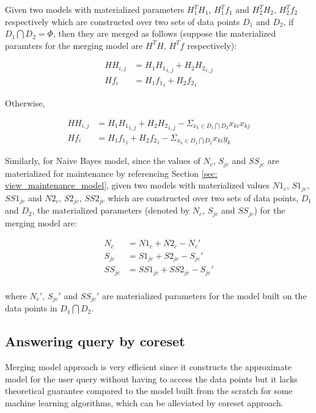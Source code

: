 Given two models with materialized parameters $H_1^TH_1$, $H_1^Tf_1$ and $H_2^TH_2$, $H_2^Tf_2$ respectively which are constructed over two sets of data points $D_1$ and $D_2$, if $D_1 \bigcap D_2 = \Phi$, then they are merged as follows (suppose the materialized paramters for the merging model are $H^TH$, $H^Tf$ respectively):

\begin{equation}
\begin{split}
{HH}_{i,j} &= {H_1H_1}_{i,j} + {H_2H_2}_{i,j}\\
{Hf}_{i} &= {H_1f_1}_{i} + {H_2f_2}_{i}
\end{split}
\end{equation}

Otherwise,

\begin{equation}
\begin{split}
{HH}_{i,j} &= {H_1H_1}_{i,j} + {H_2H_2}_{i,j} - \Sigma_{\bar{x}_k \in D_1 \bigcap D_2}x_{ki}x_{kj} \\
{Hf}_{i} &= {H_1f_1}_{i} + {H_2f_2}_{i} - \Sigma_{\bar{x}_k \in D_1 \bigcap D_2}x_{ki}y_{k} 
\end{split}
\end{equation}

Similarly, for Naive Bayes model, since the values of $N_c$, $S_{jc}$ and $SS_{jc}$ are materialized for maintenance by referencing Section \ref{sec: view_maintenance_model}, given two models with materialized values $N1_c$, $S1_{jc}$, $SS1_{jc}$ and $N2_c$, $S2_{jc}$, $SS2_{jc}$ which are constructed over two sets of data points, $D_1$ and $D_2$, the materialized parameters (denoted by $N_c$, $S_{jc}$ and $SS_{jc}$) for the merging model are:

\begin{equation}
\begin{split}
N_c &= N1_c + N2_c-N_c'\\
S_{jc} &= S1_{jc} + S2_{jc}-S_{jc}'\\
SS_{jc} &= SS1_{jc} + SS2_{jc}-S_{jc}'\\
\end{split}
\end{equation}

where $N_c'$, $S_{jc}'$ and $SS_{jc}'$ are materialized parameters for the model built on the data points in $D_1 \bigcap D_2$.

\subsection{Answering query by coreset}
Merging model approach is very efficient since it constructs the approximate model for the user query without having to access the data points but it lacks theoretical guarantee compared to the model built from the scratch for some machine learning algorithms, which can be alleviated by coreset approach.

